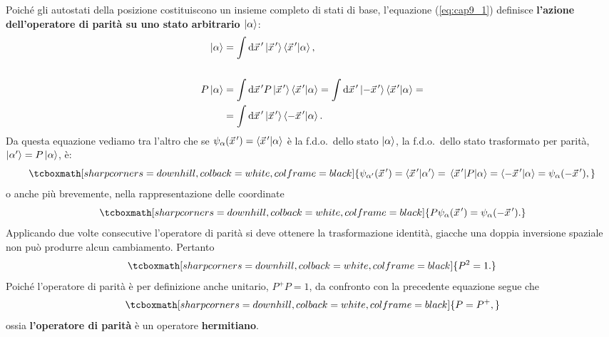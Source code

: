 \documentclass[a4paper,12pt,oneside]{book}
\begin{document}
Poiché gli autostati della posizione costituiscono un insieme completo di stati di base, l'equazione (\ref{eq:cap9_1}) definisce \textbf{l'azione dell'operatore di parità su uno stato arbitrario $\ket{\alpha}$}:
	\begin{align}
	  \ket{\alpha} &= \int\dd \vec{x}^{\, \prime} \ket{\vec{x}^{\, \prime}}\braket{\vec{x}^{\, \prime}}{\alpha},\\
	  \nonumber \\
	  P\ket{\alpha} &= \int\dd \vec{x}^{\, \prime} P\ket{ \vec{x}^{\, \prime}}\braket{\vec{x}^{\, \prime}}{\alpha} = \int\dd \vec{x}^{\, \prime} \ket{-\vec{x}^{\, \prime}}\braket{\vec{x}^{\, \prime}}{\alpha} =\nonumber\\
	  &= \int\dd \vec{x}^{\, \prime} \ket{\vec{x}^{\, \prime}}\braket{-\vec{x}^{\, \prime}}{\alpha} .
	\end{align}
Da questa equazione vediamo tra l'altro che se $\psi_{\alpha}\qty(\vec{x}^{\, \prime}) = \braket{\vec{x}^{\, \prime}}{\alpha}$ è la f.d.o.~dello stato $\ket{\alpha}$, la f.d.o.~dello stato trasformato per parità, $\ket{\alpha'} = P\ket{\alpha}$, è:
	\begin{equation}
	  \tcboxmath[sharp corners=downhill, colback=white, colframe=black]{
		  \psi_{\alpha'}\qty(\vec{x}^{\, \prime}) = \braket{\vec{x}^{\, \prime}}{\alpha'} = \mel{\vec{x}^{\, \prime}}{P}{\alpha} = \braket{-\vec{x}^{\, \prime}}{\alpha} = \psi_{\alpha}\qty(-\vec{x}^{\, \prime})  ,
		  }
	\end{equation}
o anche più brevemente, nella rappresentazione delle coordinate
	\begin{equation}
	  \tcboxmath[sharp corners=downhill, colback=white, colframe=black]{
	  P\psi_{\alpha}\qty(\vec{x}^{\, \prime}) = \psi_{\alpha}\qty(-\vec{x}^{\, \prime}) .
	  }
	\end{equation}
Applicando due volte consecutive l'operatore di parità si deve ottenere la trasformazione identità, giacche una doppia inversione spaziale non può produrre alcun cambiamento. Pertanto
	\begin{equation}
	  \label{eq:cap9_2}
	 \tcboxmath[sharp corners=downhill, colback=white, colframe=black]{
		  P^2 = 1 .
		  }
	\end{equation}
Poiché l'operatore di parità è per definizione anche unitario, $P^{+}P=1$, da confronto con la precedente equazione segue che
	\begin{equation}
		\tcboxmath[sharp corners=downhill, colback=white, colframe=black]{
			P= P^{+} ,
			}
	\end{equation}
ossia \textbf{l'operatore di parità} è un operatore \textbf{hermitiano}.\\
\end{document}
